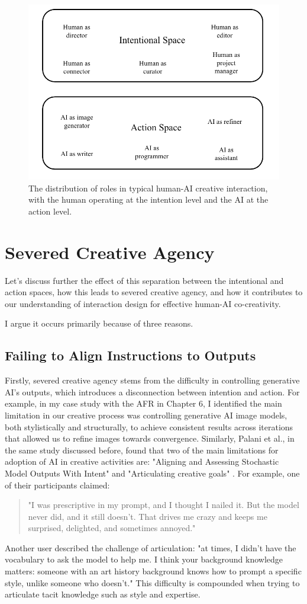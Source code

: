 \begin{figure}[H]
    \centering
    \includegraphics[width=0.75\linewidth]{roles.png}
    \caption{The distribution of roles in typical human-AI creative interaction, with the human operating at the intention level and the AI at the action level.}
    \label{fig:roles-in-spaces}
\end{figure}

\section{Severed Creative Agency}
Let's discuss further the effect of this separation between the intentional and action spaces, how this leads to severed creative agency, and how it contributes to our understanding of interaction design for effective human-AI co-creativity.

I argue it occurs primarily because of three reasons. 


\subsection{Failing to Align Instructions to Outputs}

Firstly, severed creative agency stems from the difficulty in controlling generative AI's outputs, which introduces a disconnection between intention and action. For example, in my case study with the AFR in Chapter 6, I identified the main limitation in our creative process was controlling generative AI image models, both stylistically and structurally, to achieve consistent results across iterations that allowed us to refine images towards convergence. Similarly, Palani et al., in the same study discussed before, found that two of the main limitations for adoption of AI in creative activities are: "Aligning and Assessing Stochastic Model Outputs With Intent" and "Articulating creative goals" \cite{Palani2024-on}. For example, one of their participants claimed:
\begin{quote}
"I was prescriptive in my prompt, and I thought I nailed it. But the model never did, and it still doesn’t. That drives me crazy and keeps me surprised, delighted, and sometimes annoyed."
\end{quote}
Another user described the challenge of articulation: "at times, I didn’t have the vocabulary to ask the model to help me. I think your background knowledge matters: someone with an art history background knows how to prompt a specific style, unlike someone who doesn’t." This difficulty is compounded when trying to articulate tacit knowledge such as style and expertise.

